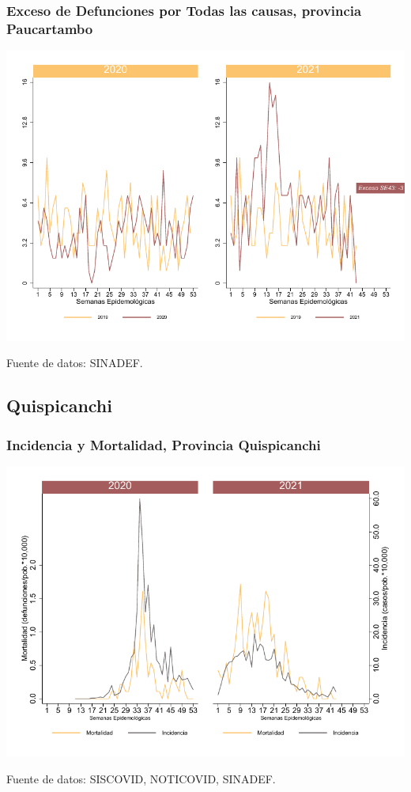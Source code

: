 \documentclass[xcolor=table]{beamer}
\begin{document}
\begin{frame}
	\frametitle{Exceso de Defunciones por Todas las causas, provincia Paucartambo}
	\vspace{-.5cm}
	\begin{center}
		\includegraphics[width=0.8\linewidth, trim={0cm .5cm 0cm 0.2cm},clip]{../figuras/exceso_11.pdf}
	\end{center}
	{\tiny Fuente de datos: SINADEF.}
	
	\hyperlink{indicadores_provinciales}{}
\end{frame}


\subsection{Quispicanchi}

\begin{frame}[label=Quispicanchi]
	\frametitle{Incidencia y Mortalidad, Provincia Quispicanchi}
	\vspace{-.5cm}
	\begin{center}
		\includegraphics[width=0.8\linewidth, trim={0cm .5cm 0cm 0.2cm},clip]{../figuras/incidencia_mortalidad_20_21_12.pdf}
	\end{center}
	{\tiny Fuente de datos: SISCOVID, NOTICOVID, SINADEF.}
\end{frame}
\end{document}
